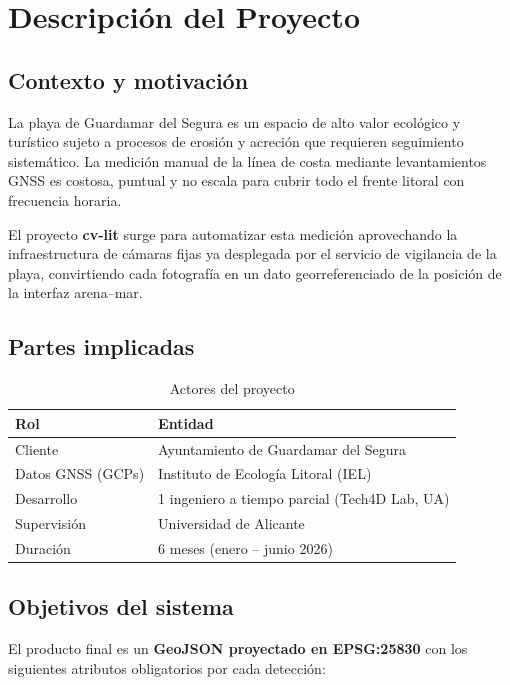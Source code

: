 \chapter{Descripción del Proyecto}
\label{ch:overview}

\section{Contexto y motivación}

La playa de Guardamar del Segura es un espacio de alto valor ecológico y turístico sujeto a
procesos de erosión y acreción que requieren seguimiento sistemático. La medición manual de la
línea de costa mediante levantamientos GNSS es costosa, puntual y no escala para cubrir todo el
frente litoral con frecuencia horaria.

El proyecto \textbf{cv-lit} surge para automatizar esta medición aprovechando la infraestructura
de cámaras fijas ya desplegada por el servicio de vigilancia de la playa, convirtiendo cada
fotografía en un dato georreferenciado de la posición de la interfaz arena--mar.

\section{Partes implicadas}

\begin{table}[H]
\centering
\caption{Actores del proyecto}
\label{tab:actors}
\begin{tabular}{L{4cm} L{9cm}}
\toprule
\textbf{Rol} & \textbf{Entidad} \\
\midrule
Cliente & Ayuntamiento de Guardamar del Segura \\
Datos GNSS (GCPs) & Instituto de Ecología Litoral (IEL) \\
Desarrollo & 1 ingeniero a tiempo parcial (Tech4D Lab, UA) \\
Supervisión & Universidad de Alicante \\
Duración & 6 meses (enero -- junio 2026) \\
\bottomrule
\end{tabular}
\end{table}

\section{Objetivos del sistema}

El producto final es un \textbf{GeoJSON proyectado en EPSG:25830} con los siguientes atributos
obligatorios por cada detección:

